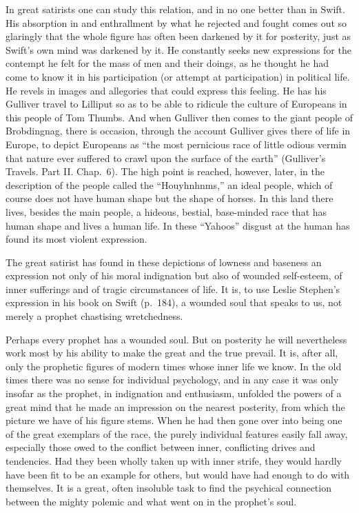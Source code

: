 \documentclass[12pt]{book}
\newcommand{\opage}[1]{\marginnote{\footnotesize\textit{[#1]}}}
\begin{document}
In great satirists one can study this relation, and in no one better than in
Swift. His absorption in and enthrallment by what he rejected and fought comes out so
glaringly that the whole figure has often been darkened by it for posterity, just as
Swift's own mind was darkened by it. He constantly seeks new expressions for the
contempt he felt for the mass of men and their doings, as he thought he had come to
know it in his participation (or attempt at participation) in political life. He
revels in images and allegories that could express this feeling. He has his Gulliver
travel to Lilliput so as to be able to ridicule the culture of Europeans in this
people of Tom Thumbs. And when Gulliver then comes to the giant people of
Brobdingnag, there is occasion, through the account Gulliver gives there of life in
Europe, to depict Europeans as ``the most pernicious race of little odious vermin
that nature ever suffered to crawl upon the surface of the earth'' (Gulliver's
Travels. Part II. Chap.~6). %
The high point is reached, however, later, in the
description of the people called the ``Houyhnhnms,'' an ideal people, which of course
does not have human shape but the shape of horses. In this land there lives, besides
the main people, a hideous, bestial, base-minded race that has human shape and lives
a human life. In these ``Yahoos'' disgust at the human has found its most violent
expression.

The great satirist has found in these depictions of lowness and baseness an
expression not only of his moral indignation but also of wounded self-esteem, of
inner sufferings and of tragic circumstances of life. It is, to use Leslie Stephen's
expression in his book on Swift (p.~184), a wounded soul that speaks to us, not
merely a prophet chastising wretchedness.

Perhaps every prophet has a wounded soul. But on posterity he will nevertheless work
most by his ability to make the great and the true prevail. It is, after all, only
the prophetic \opage{61}figures of modern times whose inner life we know. In the old
times there was no sense for individual psychology, and in any case it was only
insofar as the prophet, in indignation and enthusiasm, unfolded the powers of a great
mind that he made an impression on the nearest posterity, from which the picture we
have of his figure stems. When he had then gone over into being one of the great
exemplars of the race, the purely individual features easily fall away, especially
those owed to the conflict between inner, conflicting drives and tendencies. Had
they been wholly taken up with inner strife, they would hardly have been fit to be
an example for others, but would have had enough to do with themselves. It is a
great, often insoluble task to find the psychical connection between the mighty
polemic and what went on in the prophet's soul.
\end{document}
